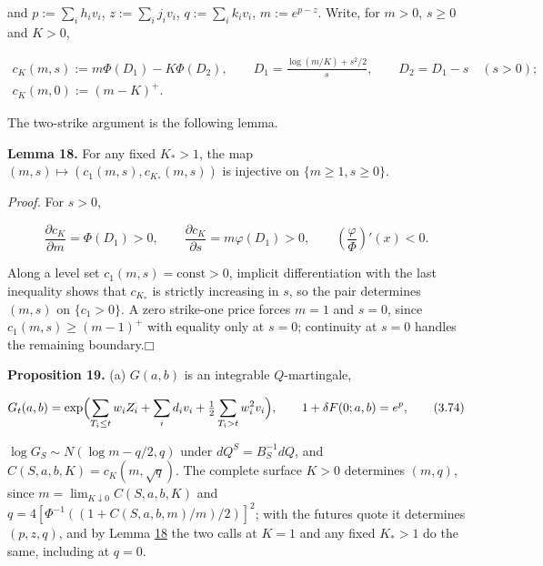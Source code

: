 \documentclass[11pt]{article}
\providecommand{\square}{\mdlgwhtsquare}
\begin{document}
and \(p := \sum_i h_i v_i\), \(z := \sum_i j_i v_i\), \(q := \sum_i k_i v_i\), \(m := e^{p - z}\). Write, for \(m > 0\), \(s \ge 0\) and \(K > 0\),

\begin{equation*}
\begin{gathered}
c_K(m, s) := m \Phi(D_1) - K \Phi(D_2), \qquad D_1 = \frac{\log(m / K) + s^2 / 2}{s}, \qquad D_2 = D_1 - s \quad (s > 0); \\
c_K(m, 0) := (m - K)^+.
\end{gathered} \tag{3.72}\label{eq:3.72}
\end{equation*}

The two-strike argument is the following lemma.

\label{res:Lemma-18}
\textbf{Lemma 18.} For any fixed \(K_* > 1\), the map \((m, s) \mapsto (c_1(m, s), c_{K_*}(m, s))\) is injective on \(\{m \ge 1, s \ge 0\}\).

\emph{Proof.} For \(s > 0\),

\begin{equation*}
\frac{\partial c_K}{\partial m} = \Phi(D_1) > 0, \qquad \frac{\partial c_K}{\partial s} = m \varphi(D_1) > 0, \qquad \left( \frac{\varphi}{\Phi} \right)'(x) < 0. \tag{3.73}\label{eq:3.73}
\end{equation*}

Along a level set \(c_1(m, s) = \text{const} > 0\), implicit differentiation with the last inequality shows that \(c_{K_*}\) is strictly increasing in \(s\), so the pair determines \((m, s)\) on \(\{c_1 > 0\}\). A zero strike-one price forces \(m = 1\) and \(s = 0\), since \(c_1(m, s) \ge (m - 1)^+\) with equality only at \(s = 0\); continuity at \(s = 0\) handles the remaining boundary.\hfill$\square$

\label{res:Proposition-19}
\textbf{Proposition 19.} (a) \(G(a, b)\) is an integrable \(Q\)-martingale,

\begin{equation*}
G_t(a, b) = \exp\Bigl( \sum_{T_i \le t} w_i Z_i + \sum_i d_i v_i + \tfrac12 \sum_{T_i > t} w_i^2 v_i \Bigr), \qquad 1 + \delta F(0; a, b) = e^p, \tag{3.74}\label{eq:3.74}
\end{equation*}

\(\log G_S \sim N(\log m - q/2, q)\) under \(dQ^S = B_S^{-1} dQ\), and \(C(S, a, b, K) = c_K(m, \sqrt q)\). The complete surface \(K > 0\) determines \((m, q)\), since \(m = \lim_{K \downarrow 0} C(S, a, b, K)\) and \(q = 4[\Phi^{-1}((1 + C(S, a, b, m) / m) / 2)]^2\); with the futures quote it determines \((p, z, q)\), and by Lemma \hyperref[res:Lemma-18]{18} the two calls at \(K = 1\) and any fixed \(K_* > 1\) do the same, including at \(q = 0\).
\end{document}
